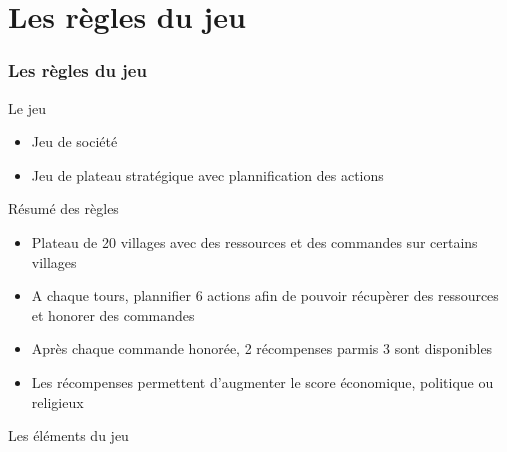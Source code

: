 \section{Les règles du jeu}
	\begin{frame}
		\frametitle{Les règles du jeu}
		
			\begin{block}{Le jeu}
				\begin{itemize}
					\item Jeu de société
					\item Jeu de plateau stratégique avec plannification des actions
				\end{itemize}
			\end{block}
		
			\begin{block}{Résumé des règles}
				\begin{itemize}
					\item Plateau de 20 villages avec des ressources et des commandes sur certains villages
					\item A chaque tours, plannifier 6 actions afin de pouvoir récupèrer des ressources et honorer des commandes
					\item Après chaque commande honorée, 2 récompenses parmis 3 sont disponibles
					\item Les récompenses permettent d'augmenter le score économique, politique ou religieux
				\end{itemize}
			\end{block}
		
	\end{frame}

	\begin{frame}
	
		\begin{block}{Les éléments du jeu}
			
		\end{block}

	\end{frame}


